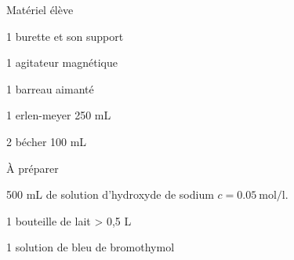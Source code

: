 
\begin{boiteMateriel}{Matériel élève}

  \begin{listePoints}
    \item 1 burette et son support
    \item 1 agitateur magnétique
    \item 1 barreau aimanté
    \item 1 erlen-meyer 250 mL
    \item 2 bécher 100 mL
  \end{listePoints}
\end{boiteMateriel}

\begin{boiteMateriel}{À préparer}
  \begin{listePoints}
    \item 500 mL de solution d'hydroxyde de sodium $c = \qty{0,05}{\mol\per\litre}$.
    \item 1 bouteille de lait > 0,5 L
    \item 1 solution de bleu de bromothymol
  \end{listePoints}
\end{boiteMateriel}